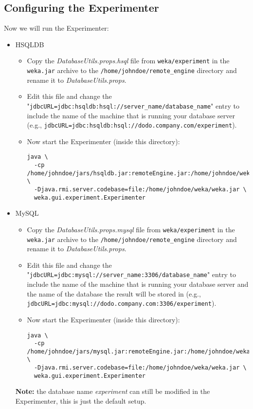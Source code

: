\subsection{Configuring the Experimenter}

Now we will run the Experimenter:

\begin{itemize}
	\item HSQLDB
		\begin{itemize}
   		\item Copy the \textit{DatabaseUtils.props.hsql} file from \texttt{weka/experiment} in the \texttt{weka.jar} archive to the \texttt{/home/johndoe/remote\_engine} directory and rename it to \textit{DatabaseUtils.props}.
		   \item Edit this file and change the "\small{\texttt{jdbcURL=jdbc:hsqldb:hsql://server\_name/database\_name}}" entry to include the name of the machine that is running your database server (e.g., \small{\texttt{jdbcURL=jdbc:hsqldb:hsql://dodo.company.com/experiment}}).
		   \item Now start the Experimenter (inside this directory): 
				\small{\begin{verbatim}
java \
  -cp /home/johndoe/jars/hsqldb.jar:remoteEngine.jar:/home/johndoe/weka/weka.jar \
  -Djava.rmi.server.codebase=file:/home/johndoe/weka/weka.jar \
  weka.gui.experiment.Experimenter
				\end{verbatim}}
		\end{itemize}

	\item MySQL
		\begin{itemize}
   		\item Copy the \textit{DatabaseUtils.props.mysql} file from \texttt{weka/experiment} in the \texttt{weka.jar} archive to the \texttt{/home/johndoe/remote\_engine} directory and rename it to \textit{DatabaseUtils.props}.
		   \item Edit this file and change the "\small{\texttt{jdbcURL=jdbc:mysql://server\_name:3306/database\_name}}" entry to include the name of the machine that is running your database server and the name of the database the result will be stored in (e.g., \small{\texttt{jdbcURL=jdbc:mysql://dodo.company.com:3306/experiment}}). 
		   \item Now start the Experimenter (inside this directory): 
				\small{\begin{verbatim}
java \
  -cp /home/johndoe/jars/mysql.jar:remoteEngine.jar:/home/johndoe/weka/weka.jar \
  -Djava.rmi.server.codebase=file:/home/johndoe/weka/weka.jar \
  weka.gui.experiment.Experimenter
				\end{verbatim}}
		\end{itemize}
		
		\textbf{Note:} the database name \textit{experiment} can still be modified in the Experimenter, this is just the default setup.
\end{itemize}

